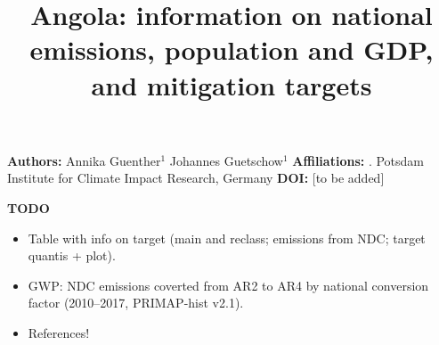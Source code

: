 \documentclass[12pt]{article}
\title{ \bfseries \color{PIKorange} Angola: information on national emissions, population and GDP, and mitigation targets}
\begin{document}
 \maketitle

 \noindent \textbf{Authors:} \newline
 \indent Annika Guenther$^{1}$ \newline
 \indent Johannes Guetschow$^{1}$ \newline
 \noindent \textbf{Affiliations:} \newline
 . Potsdam Institute for Climate Impact Research, Germany \newline
 \noindent \textbf{DOI:} [to be added] \newline

 \textbf{TODO}
 \begin{itemize}
 \item Table with info on target (main and reclass; emissions from NDC; target quantis + plot).
 \item GWP: NDC emissions coverted from AR2 to AR4 by national conversion factor (2010--2017, PRIMAP-hist v2.1).
 \item References!
 \end{itemize}

\end{document}
